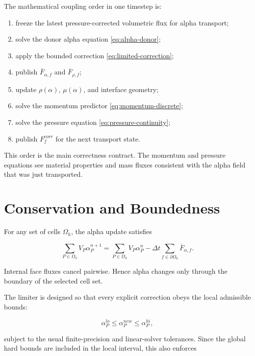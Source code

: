 \documentclass[11pt]{article}
\begin{document}
The mathematical coupling order in one timestep is:

\begin{enumerate}[leftmargin=2.5em]
  \item freeze the latest pressure-corrected volumetric flux for alpha
        transport;
  \item solve the donor alpha equation \eqref{eq:alpha-donor};
  \item apply the bounded correction \eqref{eq:limited-correction};
  \item publish \(\bar{F}_{\alpha,f}\) and \(\bar{F}_{\rho,f}\);
  \item update \(\rho(\alpha)\), \(\mu(\alpha)\), and interface geometry;
  \item solve the momentum predictor \eqref{eq:momentum-discrete};
  \item solve the pressure equation \eqref{eq:pressure-continuity};
  \item publish \(F_f^{corr}\) for the next transport state.
\end{enumerate}

This order is the main correctness contract.  The momentum and pressure
equations see material properties and mass fluxes consistent with the alpha
field that was just transported.

\section{Conservation and Boundedness}

For any set of cells \(\Omega_h\), the alpha update satisfies

\begin{equation}
  \sum_{P\in\Omega_h}V_P\alpha_P^{n+1}
  =
  \sum_{P\in\Omega_h}V_P\alpha_P^n
  -
  \Delta t
  \sum_{f\in\partial\Omega_h}
  \bar{F}_{\alpha,f}.
\end{equation}

Internal face fluxes cancel pairwise.  Hence alpha changes only through the
boundary of the selected cell set.

The limiter is designed so that every explicit correction obeys the local
admissible bounds:

\begin{equation}
  \alpha_P^{lo}
  \le
  \alpha_P^{new}
  \le
  \alpha_P^{hi},
\end{equation}

subject to the usual finite-precision and linear-solver tolerances.  Since the
global hard bounds are included in the local interval, this also enforces
\end{document}
